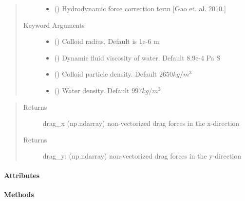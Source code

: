 \documentclass[letterpaper,10pt,english]{sphinxmanual}
\begin{document}
\begin{fulllineitems}
\begin{quote}
\begin{description}
\begin{itemize}
\item {} 
 () \textendash{} Hydrodynamic force correction term {[}Gao et. al. 2010.{]}

\end{itemize}

\item[{Keyword Arguments}] \leavevmode\begin{itemize}
\item {} 
 () \textendash{} Colloid radius. Default is 1e-6 m

\item {} 
 () \textendash{} Dynamic fluid viscosity of water. Default 8.9e-4 Pa S

\item {} 
 () \textendash{} Colloid particle density. Default \(2650 kg/m^3\)

\item {} 
 () \textendash{} Water density. Default \(997 kg/m^3\)

\end{itemize}

\end{description}\end{quote}
\begin{quote}\begin{description}
\item[{Returns}] \leavevmode
drag\_x (np.ndarray) non-vectorized drag forces in the x-direction

\item[{Returns}] \leavevmode
drag\_y: (np.ndarray) non-vectorized drag forces in the y-direction

\end{description}\end{quote}
\paragraph{Attributes}
\paragraph{Methods}


\end{fulllineitems}
\end{document}
